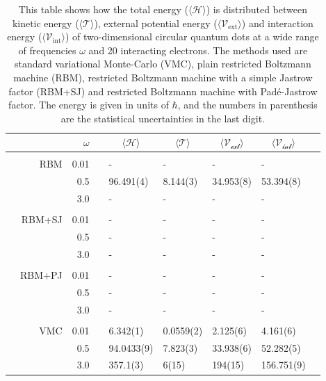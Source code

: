 \begin{table}
	\caption{This table shows how the total energy ($\langle\mathcal{H}\rangle$) is distributed between kinetic energy ($\langle\mathcal{T}\rangle$), external potential energy ($\langle\mathcal{V}_{\text{ext}}\rangle$) and interaction energy ($\langle\mathcal{V}_{\text{int}}\rangle$) of two-dimensional circular quantum dots at a wide range of frequencies $\omega$ and 20 interacting electrons. The methods used are standard variational Monte-Carlo (VMC), plain restricted Boltzmann machine (RBM), restricted Boltzmann machine with a simple Jastrow factor (RBM+SJ) and restricted Boltzmann machine with Padé-Jastrow factor. The energy is given in units of $\hbar$, and the numbers in parenthesis are the statistical uncertainties in the last digit.}
	\label{tab:splitfrequencyQD2D20P}
	\begin{tabularx}{\textwidth}{R{1cm}rrcR{2.3cm}R{2.3cm}R{2.3cm}R{2.3cm}R{0.3cm}} \hline\hline
		&\makecell{\\ \phantom{$N$} \\ \phantom{=}} & $\omega$ &&  &  &  &  \\ \hline \\
		&RBM & 0.01 && - & - & - & - \\
		&& 0.5 && 96.491(4) & 8.144(3) & 34.953(8) & 53.394(8) \\
		&& 3.0 && - & - & - & - \\ \hdashline \\
		
		&RBM+SJ & 0.01 && - & - & - & - \\
		&& 0.5 && - & - & - & - \\
		&& 3.0 && - & - & - & - \\ \hdashline \\
		
		&RBM+PJ & 0.01 && - & - & - & - \\
		&& 0.5 && - & - & - & - \\
		&& 3.0 && - & - & - & - \\ \hdashline \\
		
		&VMC & 0.01 && 6.342(1) & 0.0559(2) & 2.125(6) & 4.161(6) \\
		&& 0.5 && 94.0433(9) & 7.823(3) & 33.938(6) & 52.282(5) \\
		&& 3.0 && 357.1(3) & 6(15) & 194(15) & 156.751(9) \\ \hline \hline
	\end{tabularx}
\end{table} 
\fi

